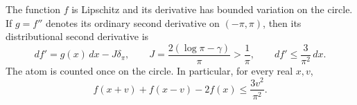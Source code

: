 \begin{lemma}
\label{scalar:curvature}
The function $f$ is Lipschitz and its derivative has bounded variation
on the circle.  If $g=f''$ denotes its ordinary second derivative on
$(-\pi,\pi)$, then its distributional second derivative is
\begin{equation}\label{scalar:derivative-measure}
 df'=g(x)\,dx-J\delta_{\pi},\qquad
 J=\frac{2(\log\pi-\gamma)}\pi>\frac1\pi,
 \qquad df'\leq\frac3{\pi^2}\,dx.
\end{equation}
The atom is counted once on the circle.  In particular, for every real
$x,v$,
\begin{equation}\label{scalar:second-difference}
 f(x+v)+f(x-v)-2f(x)\leq\frac{3v^2}{\pi^2}.
\end{equation}
\end{lemma}

